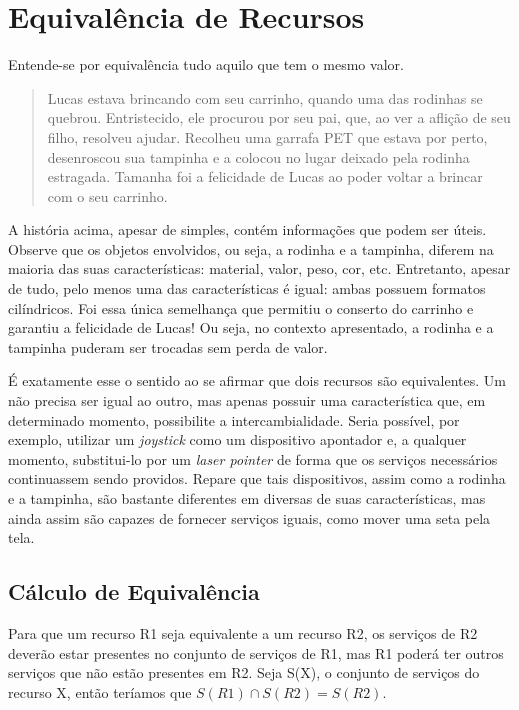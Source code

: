 \section{Equivalência de Recursos}
\label{sec:equivalenciaRecursos}

Entende-se por equivalência tudo aquilo que tem o mesmo valor.

\begin{quote}
	Lucas estava brincando com seu carrinho, quando uma das rodinhas se quebrou. Entristecido, ele procurou por seu pai, que, ao ver a aflição de seu filho, resolveu ajudar. Recolheu uma garrafa PET que estava por perto, desenroscou sua tampinha e a colocou no lugar deixado pela rodinha estragada. Tamanha foi a felicidade de Lucas ao poder voltar a brincar com o seu carrinho.
\end{quote}

A história acima, apesar de simples, contém informações que podem ser úteis. Observe que os objetos envolvidos, ou seja, a rodinha e a tampinha, diferem na maioria das suas características: material, valor, peso, cor, etc. Entretanto, apesar de tudo, pelo menos uma das características é igual: ambas possuem formatos cilíndricos. Foi essa única semelhança que permitiu o conserto do carrinho e garantiu a felicidade de Lucas! Ou seja, no contexto apresentado, a rodinha e a tampinha puderam ser trocadas sem perda de valor.

É exatamente esse o sentido ao se afirmar que dois recursos são equivalentes. Um não precisa ser igual ao outro, mas apenas possuir uma característica que, em determinado momento, possibilite a intercambialidade. Seria possível, por exemplo, utilizar um \emph{joystick} como um dispositivo apontador e, a qualquer momento, substitui-lo por um \emph{laser pointer} de forma que os serviços necessários continuassem sendo providos. Repare que tais dispositivos, assim como a rodinha e a tampinha, são bastante diferentes em diversas de suas características, mas ainda assim são capazes de fornecer serviços iguais, como mover uma seta pela tela.

\subsection{Cálculo de Equivalência}

Para que um recurso R1 seja equivalente a um recurso R2, os serviços de R2 deverão estar presentes no conjunto de serviços de R1, mas R1 poderá ter outros serviços que não estão presentes em R2. Seja S(X), o conjunto de serviços do recurso X, então teríamos que $S(R1) \cap S(R2) = S(R2)$. 

